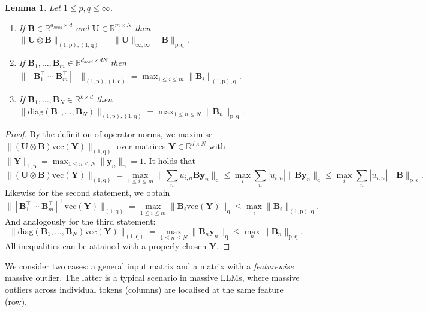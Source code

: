 \documentclass[namedate,webpdf,imanum]{ima-authoring-template}
\newcommand{\Real}{\mathbb{R}}
\newcommand{\Matrix}[1]{\mathbf{#1}}
\newcommand{\trans}{\intercal}
\newcommand{\diag}[2][]{\mathrm{diag}#1( #2 #1)}
\newcommand{\Norm}[3][]{#1\| #2 #1\|_{\mathrm{#3}}}
\newcommand{\krp}{\mathbin{\otimes}}
\newcommand{\vect}{\mathrm{vec}}
\newcommand{\Vect}[2][]{\vect#1( #2 #1)}
\newtheorem{lemma}[theorem]{Lemma}
\numberwithin{equation}{section}
\begin{document}
\begin{lemma}
\label{lemma:1p-norm}
Let $1 \leq p, q \leq \infty$.
\begin{enumerate}
    \item If $\Matrix{B} \in \Real^{d_{head} \times d}$ and $\Matrix{U} \in \Real^{m \times N}$ then $\Norm{\Matrix{U} \krp \Matrix{B}}{(1,p),(1,q)} = \Norm{\Matrix{U}}{\infty,\infty} \Norm{\Matrix{B}}{p,q}$.
    \item If $\Matrix{B}_1, \ldots, \Matrix{B}_m \in \Real^{d_{head} \times dN}$ then $\Norm{[\Matrix{B}_1^\trans~\cdots~\Matrix{B}_m^\trans]^\trans}{(1,p),(1,q)} = \max_{1 \leq i \leq m} \Norm{\Matrix{B}_i}{(1,p),q}$.
    \item If $\Matrix{B}_1, \ldots, \Matrix{B}_N \in \Real^{k \times d}$ then $\Norm{\diag{\Matrix{B}_1, \ldots, \Matrix{B}_N}}{(1,p),(1,q)} = \max_{1 \leq n \leq N} \Norm{\Matrix{B}_n}{p,q}$.
\end{enumerate}
\end{lemma}
\begin{proof}
By the definition of operator norms, we maximise $\Norm{(\Matrix{U} \krp \Matrix{B}) \Vect{\Matrix{Y}}}{(1,q)}$ over matrices $\Matrix{Y} \in \Real^{d \times N}$ with $\Norm{\Matrix{Y}}{1,p} = \max_{1 \leq n \leq N} \Norm{\Matrix{y}_n}{p} = 1$.
It holds that
\begin{equation*}
    \Norm{(\Matrix{U} \krp \Matrix{B}) \Vect{\Matrix{Y}}}{(1,q)} = \max_{1 \leq i \leq m} \Norm[\Big]{\sum_{n} u_{i,n} \Matrix{B} \Matrix{y}_n}{q} \leq \max_{i} \sum_{n} |u_{i,n}| \Norm{\Matrix{B} \Matrix{y}_n}{q} \leq \max_{i} \sum_{n} |u_{i,n}| \Norm{\Matrix{B}}{p,q}.
\end{equation*}
Likewise for the second statement, we obtain
\begin{equation*}
    \Norm{[\Matrix{B}_1^\trans~\cdots~\Matrix{B}_m^\trans]^\trans \Vect{\Matrix{Y}}}{(1,q)} = \max_{1 \leq i \leq m} \Norm{\Matrix{B}_i \Vect{\Matrix{Y}}}{q} \leq \max_i \Norm{\Matrix{B}_i}{(1,p),q}.
\end{equation*}
And analogously for the third statement:
\begin{equation*}
    \Norm{\diag{\Matrix{B}_1, \ldots, \Matrix{B}_N} \Vect{\Matrix{Y}}}{(1,q)} = \max_{1 \leq n \leq N} \Norm{\Matrix{B}_n \Matrix{y}_n}{q} \leq \max_{n} \Norm{\Matrix{B}_n}{p,q}.
\end{equation*}
All inequalities can be attained with a properly chosen $\Matrix{Y}$.
\end{proof}

We consider two cases: a general input matrix and a matrix with a \emph{featurewise} massive outlier.
The latter is a typical scenario in massive LLMs, where massive outliers across individual tokens (columns) are localised at the same feature (row).
\end{document}
